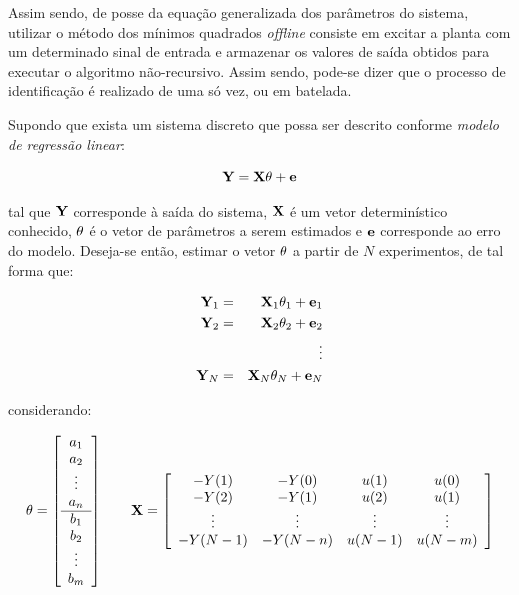 Assim sendo, de posse da equação generalizada dos parâmetros do sistema,
utilizar o método dos mínimos quadrados {\it offline} consiste em excitar a
planta com um determinado sinal de entrada e armazenar os valores de saída
obtidos para executar o algoritmo não-recursivo. Assim sendo, pode-se dizer que
o processo de identificação é realizado de uma só vez, ou em batelada.

Supondo que exista um sistema discreto que possa ser descrito conforme {\it
modelo de regressão linear}:

\begin{equation}\label{eq:mode_reg_lin}
\mathbf{Y} = \mathbf{X\theta} + \mathbf{e}
\end{equation}

\noindent tal que $\mathbf{Y}$ corresponde à saída do sistema, $\mathbf{X}$ é um vetor
determinístico conhecido, $\mathbf{\theta}$ é o vetor de parâmetros a serem
estimados e $\mathbf{e}$ corresponde ao erro do modelo. Deseja-se então, estimar o
vetor $\mathbf{\theta}$ a partir de $N$ experimentos, de tal forma que:

\begin{eqnarray}
\mathbf{Y}_1 & = & \mathbf{X}_1\mathbf{\theta}_1 + \mathbf{e}_1\nonumber\\
\mathbf{Y}_2 & = & \mathbf{X}_2\mathbf{\theta}_2 + \mathbf{e}_2\nonumber\\
& & \vdots\nonumber\\ 
\mathbf{Y}_N & = & \mathbf{X}_N\mathbf{\theta}_N + \mathbf{e}_N\nonumber
\end{eqnarray}

\noindent considerando:

\begin{equation*}
\mathbf{\theta} = \left[
\begin{array}{c}
a_1\\
a_2\\
\vdots\\
a_n\\
\hline
b_1\\
b_2\\
\vdots\\
b_m
\end{array}
\right] \qquad
\mathbf{X} = \left[
\begin{array}{cccc}
-Y(1) & -Y(0) & u(1) & u(0)\\
-Y(2) & -Y(1) & u(2) & u(1)\\
\vdots & \vdots & \vdots & \vdots\\
-Y(N-1) & -Y(N-n) & u(N-1) & u(N-m)
\end{array}
\right]
\end{equation*}

